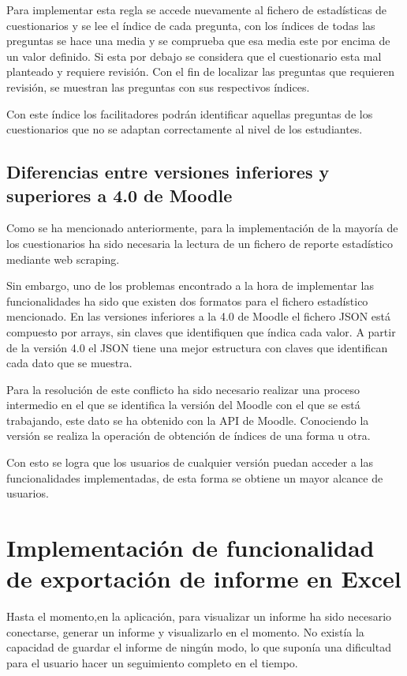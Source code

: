 Para implementar esta regla se accede nuevamente al fichero de estadísticas de cuestionarios y se lee el índice de cada pregunta, con los índices de todas las preguntas se hace una media y se comprueba que esa media este por encima de un valor definido. Si esta por debajo se considera que el cuestionario esta mal planteado y requiere revisión. Con el fin de localizar las preguntas que requieren revisión, se muestran las preguntas con sus respectivos índices.

Con este índice los facilitadores podrán identificar aquellas preguntas de los cuestionarios que no se adaptan correctamente al nivel de los estudiantes.

\subsection{Diferencias entre versiones inferiores y superiores a 4.0 de Moodle}
Como se ha mencionado anteriormente, para la implementación de la mayoría de los cuestionarios ha sido necesaria la lectura de un fichero de reporte estadístico mediante web scraping. 

Sin embargo, uno de los problemas encontrado a la hora de implementar las funcionalidades ha sido que existen dos formatos para el fichero estadístico mencionado. En las versiones inferiores a la 4.0 de Moodle el fichero JSON está compuesto por arrays, sin claves que identifiquen que índica cada valor. A partir de la versión 4.0 el JSON tiene una mejor estructura con claves que identifican cada dato que se muestra.

Para la resolución de este conflicto ha sido necesario realizar una proceso intermedio en el que se identifica la versión del Moodle con el que se está trabajando, este dato se ha obtenido con la API de Moodle\cite{moodle-api}. Conociendo la versión se realiza la operación de obtención de índices de una forma u otra.

Con esto se logra que los usuarios de cualquier versión puedan acceder a las funcionalidades implementadas, de esta forma se obtiene un mayor alcance de usuarios.

\section{Implementación de funcionalidad de exportación de informe en Excel}
Hasta el momento,en la aplicación, para visualizar un informe ha sido necesario conectarse, generar un informe y visualizarlo en el momento. No existía la capacidad de guardar el informe de ningún modo, lo que suponía una dificultad para el usuario hacer un seguimiento completo en el tiempo. 

